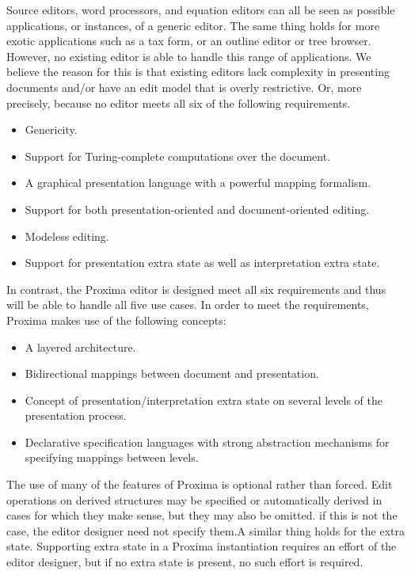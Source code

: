 \documentclass{speauth}
\begin{document}
Source editors, word processors, and equation editors can all be seen as possible applications, or instances, of a generic editor.  The same thing holds for more exotic applications such as a tax form, or an outline editor or tree browser. However, no existing editor is able to handle this range of applications. We believe the reason for this is that existing editors lack complexity in presenting documents and/or have an edit model that is overly restrictive. Or, more precisely, because no editor meets all six of the following requirements.

\begin{itemize}
\item Genericity.
\item Support for Turing-complete computations over the document.
\item A graphical presentation language with a powerful mapping formalism.
\item Support for both presentation-oriented and document-oriented editing.
\item Modeless editing.
\item Support for presentation extra state as well as interpretation extra state.
\end{itemize}

In contrast, the Proxima editor is designed meet all six requirements and thus will be able to handle all five use cases. In order to meet the requirements, Proxima makes use of the following concepts:

\begin{itemize}
\item A layered architecture.
\item Bidirectional mappings between document and presentation.
\item Concept of presentation/interpretation extra state on several levels of the presentation process.
\item Declarative specification languages with strong abstraction mechanisms for specifying mappings between levels.
\end{itemize}

The use of many of the features of Proxima is optional rather than forced. Edit operations on derived structures may be specified or automatically derived in cases for which they make sense, but they may also be omitted. \bc if this is not the case, the editor designer need not specify them.\ec A similar thing holds for the extra state. Supporting extra state in a Proxima instantiation requires an effort of the editor designer, but if no extra state is present, no such effort is required.




\end{document}
